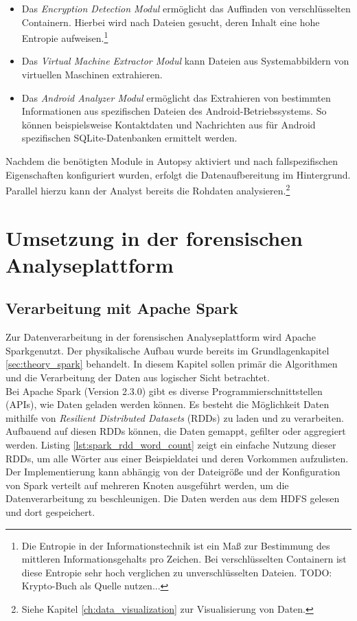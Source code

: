 \begin{itemize}
\item Das \textit{Encryption Detection Modul} ermöglicht das Auffinden von verschlüsselten Containern. Hierbei wird nach Dateien gesucht, deren Inhalt eine hohe Entropie aufweisen.\footnote{Die Entropie in der Informationstechnik ist ein Maß zur Bestimmung des mittleren Informationsgehalts pro Zeichen. Bei verschlüsselten Containern ist diese Entropie sehr hoch verglichen zu unverschlüsselten Dateien. TODO: Krypto-Buch als Quelle nutzen...}
\item Das \textit{Virtual Machine Extractor Modul} kann Dateien aus Systemabbildern von virtuellen Maschinen extrahieren.
\item Das \textit{Android Analyzer Modul} ermöglicht das Extrahieren von bestimmten Informationen aus spezifischen Dateien des Android-Betriebssystems. So können beispielsweise Kontaktdaten und Nachrichten aus für Android spezifischen SQLite-Datenbanken ermittelt werden.
\end{itemize}

\noindent
Nachdem die benötigten Module in Autopsy aktiviert und nach fallspezifischen Eigenschaften konfiguriert wurden, erfolgt die Datenaufbereitung im Hintergrund. Parallel hierzu kann der Analyst bereits die Rohdaten analysieren.\footnote{Siehe Kapitel \ref{ch:data_visualization} zur Visualisierung von Daten.}\\

\section{Umsetzung in der forensischen Analyseplattform}

\subsection{Verarbeitung mit Apache Spark}
Zur Datenverarbeitung in der forensischen Analyseplattform wird Apache Spark\texttrademark genutzt. Der physikalische Aufbau wurde bereits im Grundlagenkapitel \ref{sec:theory_spark} behandelt. In diesem Kapitel sollen primär die Algorithmen und die Verarbeitung der Daten aus logischer Sicht betrachtet.\\ 

\noindent
Bei Apache Spark (Version 2.3.0) gibt es diverse Programmierschnittstellen (APIs), wie Daten geladen werden können. Es besteht die Möglichkeit Daten mithilfe von \textit{Resilient Distributed Datasets} (RDDs) zu laden und zu verarbeiten. Aufbauend auf diesen RDDs können, die Daten gemappt, gefilter oder aggregiert werden.
Listing \ref{lst:spark_rdd_word_count} zeigt ein einfache Nutzung dieser RDDs, um alle Wörter aus einer Beispieldatei  und deren Vorkommen aufzulisten. Der Implementierung kann abhängig von der Dateigröße und der Konfiguration von Spark verteilt auf mehreren Knoten ausgeführt werden, um die Datenverarbeitung zu beschleunigen. Die Daten werden aus dem HDFS gelesen und dort gespeichert.

